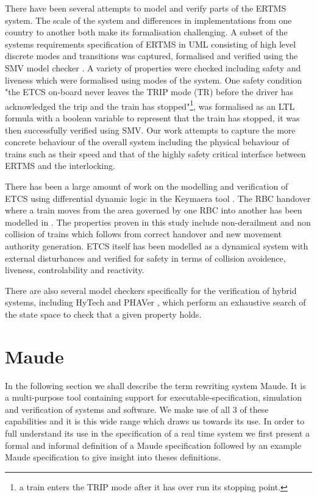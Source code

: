 There have been several attempts to model and verify parts of the ERTMS system. The scale of the system and differences in implementations from one country to another both make its formalisation challenging. A subset of the systems requirements specification of ERTMS in UML consisting of high level discrete modes and transitions was captured, formalised and verified using the SMV model checker \cite{MG14}. A variety of properties were checked including safety and liveness which were formalised using modes of the system. One safety condition  "the ETCS on-board never leaves the TRIP mode (TR) before the driver has acknowledged the trip and the train has stopped"\footnote{a train enters the TRIP mode after it has over run its stopping point.}, was formalised as an LTL formula with a boolean variable to represent that the train has stopped, it was then successfully verified using SMV. Our work attempts to capture the more concrete behaviour of the overall system including the physical behaviour of trains such as their speed and that of the highly safety critical interface between ERTMS and the interlocking. 

There has been a large amount of work on the modelling and verification of ETCS using differential dynamic logic \cite{AP08} in the Keymaera tool \cite{AP08b}. The RBC handover where a train moves from the area governed by one RBC into another has been modelled in \cite{YL11}. The properties proven in this study include non-derailment and non collision of trains which follows from correct handover and new movement authority generation. ETCS \cite{AP09} itself has been modelled as a dynamical system with external disturbances and verified for safety in terms of collision avoidence, liveness, controlability and reactivity.

There are also several model checkers specifically for the verification of hybrid systems, including HyTech \cite{AR96} and PHAVer \cite{GF05}, which perform an exhaustive search of the state space to check that a given property holds.

\section{Maude}
In the following section we shall describe the term rewriting system Maude. It is a multi-purpose tool containing support for executable-specification, simulation and verification of systems and software. We make use of all 3 of these capabilities and it is this wide range which draws us towards its use. In order to full understand its use in the specification of a real time system we first present a formal and informal definition of a Maude specification followed by an example Maude specification to give insight into theses definitions.



